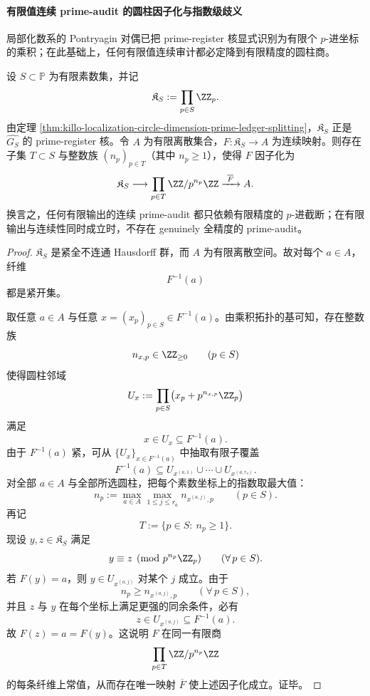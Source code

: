 \paragraph{有限值连续 prime-audit 的圆柱因子化与指数级歧义}
局部化数系的 Pontryagin 对偶已把 prime-register 核显式识别为有限个 \(p\)-进坐标的乘积；在此基础上，任何有限值连续审计都必定降到有限精度的圆柱商。

\begin{theorem}\label{thm:xi-localized-finite-prime-audit-cylinder-factorization}
设 \(S\subset\mathbb P\) 为有限素数集，并记
\[
\mathfrak K_S:=\prod_{p\in S}\ZZ_p.
\]
由定理 \ref{thm:killo-localization-circle-dimension-prime-ledger-splitting}，\(\mathfrak K_S\) 正是 \(\widehat{G_S}\) 的 prime-register 核。令 \(A\) 为有限离散集合，\(F:\mathfrak K_S\to A\) 为连续映射。则存在子集 \(T\subset S\) 与整数族 \((n_p)_{p\in T}\)（其中 \(n_p\ge 1\)），使得 \(F\) 因子化为
\[
\mathfrak K_S
\longrightarrow
\prod_{p\in T}\ZZ/p^{n_p}\ZZ
\xrightarrow{\ \overline F\ }
A.
\]
换言之，任何有限输出的连续 prime-audit 都只依赖有限精度的 \(p\)-进截断；在有限输出与连续性同时成立时，不存在 genuinely 全精度的 prime-audit。
\end{theorem}
\begin{proof}
\(\mathfrak K_S\) 是紧全不连通 Hausdorff 群，而 \(A\) 为有限离散空间。故对每个 \(a\in A\)，纤维
\[
F^{-1}(a)
\]
都是紧开集。

取任意 \(a\in A\) 与任意 \(x=(x_p)_{p\in S}\in F^{-1}(a)\)。由乘积拓扑的基可知，存在整数族
\[
n_{x,p}\in \ZZ_{\ge 0}\qquad(p\in S)
\]
使得圆柱邻域
\[
U_x:=\prod_{p\in S}\bigl(x_p+p^{n_{x,p}}\ZZ_p\bigr)
\]
满足
\[
x\in U_x\subseteq F^{-1}(a).
\]
由于 \(F^{-1}(a)\) 紧，可从 \(\{U_x\}_{x\in F^{-1}(a)}\) 中抽取有限子覆盖
\[
F^{-1}(a)\subseteq U_{x^{(a,1)}}\cup\cdots\cup U_{x^{(a,r_a)}}.
\]
对全部 \(a\in A\) 与全部所选圆柱，把每个素数坐标上的指数取最大值：
\[
n_p:=\max_{a\in A}\max_{1\le j\le r_a} n_{x^{(a,j)},p}
\qquad(p\in S).
\]
再记
\[
T:=\{p\in S:\ n_p\ge 1\}.
\]
现设 \(y,z\in\mathfrak K_S\) 满足
\[
y\equiv z \pmod{p^{n_p}\ZZ_p}
\qquad(\forall\,p\in S).
\]
若 \(F(y)=a\)，则 \(y\in U_{x^{(a,j)}}\) 对某个 \(j\) 成立。由于
\[
n_p\ge n_{x^{(a,j)},p}
\qquad(\forall\,p\in S),
\]
并且 \(z\) 与 \(y\) 在每个坐标上满足更强的同余条件，必有
\[
z\in U_{x^{(a,j)}}\subseteq F^{-1}(a).
\]
故 \(F(z)=a=F(y)\)。这说明 \(F\) 在同一有限商
\[
\prod_{p\in T}\ZZ/p^{n_p}\ZZ
\]
的每条纤维上常值，从而存在唯一映射 \(\overline F\) 使上述因子化成立。证毕。
\end{proof}

